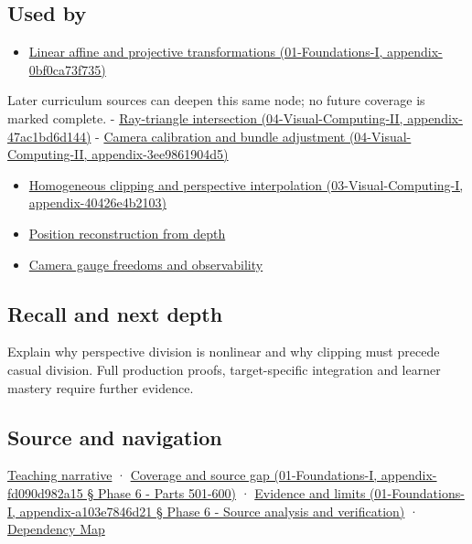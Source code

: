 \subsection{Used by}\label{used-by}

\begin{itemize}
\tightlist
\item
  \href{}{Linear affine and projective transformations (01-Foundations-I, appendix-0bf0ca73f735)}
\end{itemize}

Later curriculum sources can deepen this same node; no future coverage is marked complete. - \href{}{Ray-triangle intersection (04-Visual-Computing-II, appendix-47ac1bd6d144)} - \href{}{Camera calibration and bundle adjustment (04-Visual-Computing-II, appendix-3ee9861904d5)}

\begin{itemize}
\tightlist
\item
  \href{}{Homogeneous clipping and perspective interpolation (03-Visual-Computing-I, appendix-40426e4b2103)}
\item
  \hyperref[appendix-2cbf2968e866]{Position reconstruction from depth}
\item
  \hyperref[appendix-113f0267e5f4]{Camera gauge freedoms and observability}
\end{itemize}

\subsection{Recall and next depth}\label{recall-and-next-depth}

Explain why perspective division is nonlinear and why clipping must precede casual division. Full production proofs, target-specific integration and learner mastery require further evidence.

\subsection{Source and navigation}\label{source-and-navigation}

\href{Continuous\%20Notes/Computing\%20Foundations\%20-\%20From\%20Bits\%20to\%20C++\%20and\%20Systems\%20APIs\#Homogeneous\%20coordinates\%20preserve\%20the\%20role\%20of\%20a\%20location}{Teaching narrative} · \href{}{Coverage and source gap (01-Foundations-I, appendix-fd090d982a15 § Phase 6 - Parts 501-600)} · \href{}{Evidence and limits (01-Foundations-I, appendix-a103e7846d21 § Phase 6 - Source analysis and verification)} · \hyperref[appendix-4ad47bdd269a]{Dependency Map}

